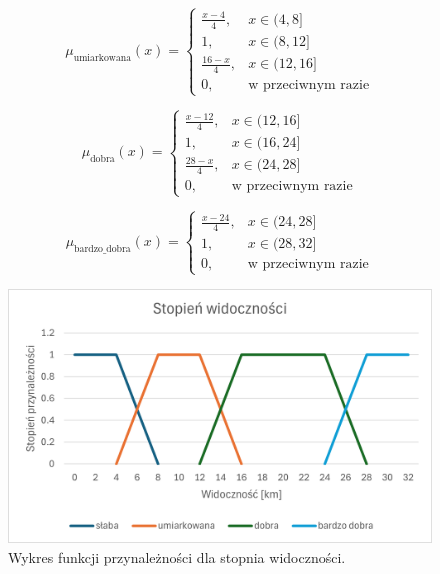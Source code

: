 \documentclass{article}
\begin{document}
\begin{enumerate}
    \begin{equation}
    \mu_{\text{umiarkowana}}(x) =
    \begin{cases}
    \frac{x - 4}{4}, & x \in (4, 8] \\
    1, & x \in (8, 12] \\
    \frac{16 - x}{4}, & x \in (12, 16] \\
    0, & \text{w przeciwnym razie}
    \end{cases}
    \end{equation}
    
    \begin{equation}
    \mu_{\text{dobra}}(x) =
    \begin{cases}
    \frac{x - 12}{4}, & x \in (12, 16] \\
    1, & x \in (16, 24] \\
    \frac{28 - x}{4}, & x \in (24, 28] \\
    0, & \text{w przeciwnym razie}
    \end{cases}
    \end{equation}

    \begin{equation}
    \mu_{\text{bardzo\_dobra}}(x) =
    \begin{cases}
    \frac{x - 24}{4}, & x \in (24, 28] \\
    1, & x \in (28, 32] \\
    0, & \text{w przeciwnym razie}
    \end{cases}
    \end{equation}

    \begin{figure}[H]
    \centering
    \includegraphics[width=\textwidth]{img/visibility.png}
    \caption{Wykres funkcji przynależności dla stopnia widoczności.}
    \end{figure}


\end{enumerate}
\end{document}
